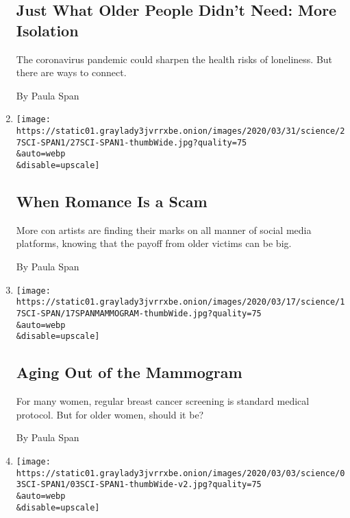 \begin{enumerate}
{  \subsection{Just What Older People Didn't Need: More
  Isolation}\label{just-what-older-people-didnt-need-more-isolation}}

  The coronavirus pandemic could sharpen the health risks of loneliness.
  But there are ways to connect.

  By Paula Span
\item
  \href{/2020/03/27/well/elderly-romance-scam.html}{}

  \texttt{[image: https://static01.graylady3jvrrxbe.onion/images/2020/03/31/science/27SCI-SPAN1/27SCI-SPAN1-thumbWide.jpg?quality=75\\\&auto=webp\\\&disable=upscale]}

  \hypertarget{when-romance-is-a-scam}{%
  \subsection{When Romance Is a Scam}\label{when-romance-is-a-scam}}

  More con artists are finding their marks on all manner of social media
  platforms, knowing that the payoff from older victims can be big.

  By Paula Span
\item
  \href{/2020/03/16/health/breastcancer-elderly-old-age.html}{}

  \texttt{[image: https://static01.graylady3jvrrxbe.onion/images/2020/03/17/science/17SCI-SPAN/17SPANMAMMOGRAM-thumbWide.jpg?quality=75\\\&auto=webp\\\&disable=upscale]}

  \hypertarget{aging-out-of-the-mammogram}{%
  \subsection{Aging Out of the
  Mammogram}\label{aging-out-of-the-mammogram}}

  For many women, regular breast cancer screening is standard medical
  protocol. But for older women, should it be?

  By Paula Span
\item
  \href{/2020/03/03/health/drug-trial-alzheimers-volunteer.html}{}

  \texttt{[image: https://static01.graylady3jvrrxbe.onion/images/2020/03/03/science/03SCI-SPAN1/03SCI-SPAN1-thumbWide-v2.jpg?quality=75\\\&auto=webp\\\&disable=upscale]}

  \hypertarget{when-a-drug-study-abruptly-ends-volunteers-are-left-to-cope}{%
}
\end{enumerate}
